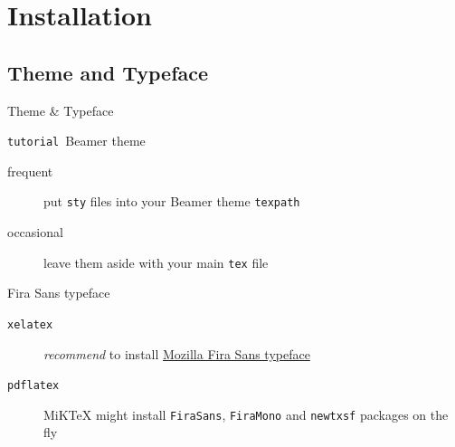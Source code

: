 \documentclass{beamer}%
\newcommand{\theme}{\texttt{tutorial}}
\begin{document}
\section{Installation}
\subsection{Theme and Typeface}
\begin{frame}{Theme \& Typeface}
\begin{block}{\theme\ Beamer theme}
	\begin{description}
	\item[frequent] put \texttt{sty} files into your Beamer theme \texttt{texpath}
	\item[occasional] leave them aside with your main \texttt{tex} file
	\end{description}
\end{block}

\begin{block}{Fira Sans typeface}
	\begin{description}
	\item[\texttt{xelatex}] \emph{recommend} to install \href{https://www.mozilla.org/en-US/styleguide/products/firefox-os/typeface/}{Mozilla Fira Sans typeface}
	\item[\texttt{pdflatex}] MiKTeX might install \texttt{FiraSans}, \texttt{FiraMono} and \texttt{newtxsf} packages on the fly
	\end{description}
\end{block}
\end{frame}
\end{document}
